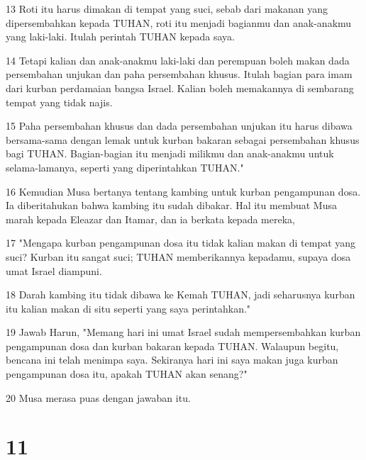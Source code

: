 \par 13 Roti itu harus dimakan di tempat yang suci, sebab dari makanan yang dipersembahkan kepada TUHAN, roti itu menjadi bagianmu dan anak-anakmu yang laki-laki. Itulah perintah TUHAN kepada saya.
\par 14 Tetapi kalian dan anak-anakmu laki-laki dan perempuan boleh makan dada persembahan unjukan dan paha persembahan khusus. Itulah bagian para imam dari kurban perdamaian bangsa Israel. Kalian boleh memakannya di sembarang tempat yang tidak najis.
\par 15 Paha persembahan khusus dan dada persembahan unjukan itu harus dibawa bersama-sama dengan lemak untuk kurban bakaran sebagai persembahan khusus bagi TUHAN. Bagian-bagian itu menjadi milikmu dan anak-anakmu untuk selama-lamanya, seperti yang diperintahkan TUHAN."
\par 16 Kemudian Musa bertanya tentang kambing untuk kurban pengampunan dosa. Ia diberitahukan bahwa kambing itu sudah dibakar. Hal itu membuat Musa marah kepada Eleazar dan Itamar, dan ia berkata kepada mereka,
\par 17 "Mengapa kurban pengampunan dosa itu tidak kalian makan di tempat yang suci? Kurban itu sangat suci; TUHAN memberikannya kepadamu, supaya dosa umat Israel diampuni.
\par 18 Darah kambing itu tidak dibawa ke Kemah TUHAN, jadi seharusnya kurban itu kalian makan di situ seperti yang saya perintahkan."
\par 19 Jawab Harun, "Memang hari ini umat Israel sudah mempersembahkan kurban pengampunan dosa dan kurban bakaran kepada TUHAN. Walaupun begitu, bencana ini telah menimpa saya. Sekiranya hari ini saya makan juga kurban pengampunan dosa itu, apakah TUHAN akan senang?"
\par 20 Musa merasa puas dengan jawaban itu.

\chapter{11}

